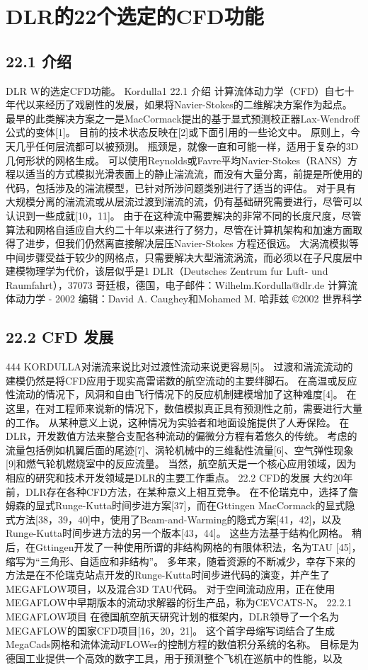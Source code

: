 \documentclass[UTF8,11pt,a4paper,openany,fontset=fandol]{ctexbook}
\begin{document}
\clearpage
\chapter{DLR的22个选定的CFD功能}
\section{22.1 介绍}
DLR W的选定CFD功能。 Kordulla1 22.1 介绍 计算流体动力学（CFD）自七十年代以来经历了戏剧性的发展，如果将Navier-Stokes的二维解决方案作为起点。 最早的此类解决方案之一是MacCormack提出的基于显式预测校正器Lax-Wendroff公式的变体[1]。 目前的技术状态反映在[2]或下面引用的一些论文中。 原则上，今天几乎任何层流都可以被预测。 瓶颈是，就像一直和可能一样，适用于复杂的3D几何形状的网格生成。 可以使用Reynolds或Favre平均Navier-Stokes（RANS）方程以适当的方式模拟光滑表面上的静止湍流流，而没有大量分离，前提是所使用的代码，包括涉及的湍流模型，已针对所涉问题类别进行了适当的评估。 对于具有大规模分离的湍流流或从层流过渡到湍流的流，仍有基础研究需要进行，尽管可以认识到一些成就[10，11]。 由于在这种流中需要解决的非常不同的长度尺度，尽管算法和网格自适应自大约二十年以来进行了努力，尽管在计算机架构和加速方面取得了进步，但我们仍然离直接解决层压Navier-Stokes 方程还很远。 大涡流模拟等中间步骤受益于较少的网格点，只需要解决大型湍流涡流，而必须以在子尺度层中建模物理学为代价，该层似乎是1 DLR（Deutsches Zentrum fur Luft- und Raumfahrt），37073 哥廷根，德国，电子邮件：Wilhelm.Kordulla@dlr.de 计算流体动力学 - 2002 编辑：David A. Caughey和Mohamed M. 哈菲兹 ©2002 世界科学

\section{22.2 CFD 发展}
444 KORDULLA对湍流来说比对过渡性流动来说更容易[5]。 过渡和湍流流动的建模仍然是将CFD应用于现实高雷诺数的航空流动的主要绊脚石。 在高温或反应性流动的情况下，风洞和自由飞行情况下的反应机制建模增加了这种难度[4]。 在这里，在对工程师来说新的情况下，数值模拟真正具有预测性之前，需要进行大量的工作。 从某种意义上说，这种情况为实验者和地面设施提供了人寿保险。 在DLR，开发数值方法来整合支配各种流动的偏微分方程有着悠久的传统。 考虑的流量包括例如机翼后面的尾迹[7]、涡轮机械中的三维黏性流量[6]、空气弹性现象[9]和燃气轮机燃烧室中的反应流量。 当然，航空航天是一个核心应用领域，因为相应的研究和技术开发领域是DLR的主要工作重点。 22.2 CFD的发展 大约20年前，DLR存在各种CFD方法，在某种意义上相互竞争。 在不伦瑞克中，选择了詹姆森的显式Runge-Kutta时间步进方案[37]，而在Gttingen MacCormack的显式隐式方法[38，39，40]中，使用了Beam-and-Warming的隐式方案[41，42]，以及Runge-Kutta时间步进方法的另一个版本[43，44]。 这些方法基于结构化网格。 稍后，在Gttingen开发了一种使用所谓的非结构网格的有限体积法，名为TAU [45]，缩写为“三角形、自适应和非结构”。 多年来，随着资源的不断减少，幸存下来的方法是在不伦瑞克站点开发的Runge-Kutta时间步进代码的演变，并产生了MEGAFLOW项目，以及混合3D TAU代码。 对于空间流动应用，正在使用MEGAFLOW中早期版本的流动求解器的衍生产品，称为CEVCATS-N。 22.2.1 MEGAFLOW项目 在德国航空航天研究计划的框架内，DLR领导了一个名为MEGAFLOW的国家CFD项目[16，20，21]。 这个首字母缩写词结合了生成MegaCads网格和流体流动FLOWer的控制方程的数值积分系统的名称。 目标是为德国工业提供一个高效的数字工具，用于预测整个飞机在巡航中的性能，以及
\end{document}
